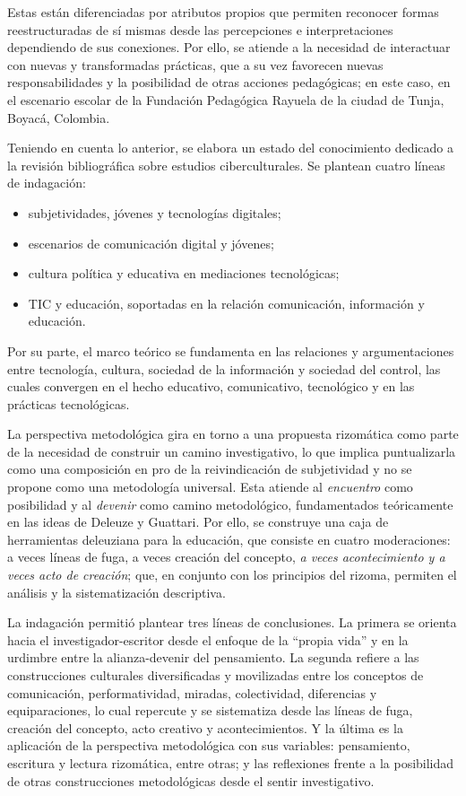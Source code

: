 \documentclass{textolivre}
\begin{document}
Estas están diferenciadas por atributos propios que permiten reconocer formas reestructuradas de sí mismas desde las percepciones e interpretaciones dependiendo de sus conexiones. Por ello, se atiende a la necesidad de interactuar con nuevas y transformadas prácticas, que a su vez favorecen nuevas responsabilidades y la posibilidad de otras acciones pedagógicas; en este caso, en el escenario escolar de la Fundación Pedagógica Rayuela de la ciudad de Tunja, Boyacá, Colombia.

Teniendo en cuenta lo anterior, se elabora un estado del conocimiento dedicado a la revisión bibliográfica sobre estudios ciberculturales. Se plantean cuatro líneas de indagación: 

\begin{itemize}
    \item subjetividades, jóvenes y tecnologías digitales;
    \item escenarios de comunicación digital y jóvenes;
    \item cultura política y educativa en mediaciones tecnológicas;
    \item TIC y educación, soportadas en la relación comunicación, información y educación. 
\end{itemize}
    
Por su parte, el marco teórico se fundamenta en las relaciones y argumentaciones entre tecnología, cultura, sociedad de la información y sociedad del control, las cuales convergen en el hecho educativo, comunicativo, tecnológico y en las prácticas tecnológicas. 

La perspectiva metodológica gira en torno a una propuesta rizomática como parte de la necesidad de construir un camino investigativo, lo que implica puntualizarla como una composición en pro de la reivindicación de subjetividad y no se propone como una metodología universal. Esta atiende al \textit{encuentro} como posibilidad y al \textit{devenir} como camino metodológico, fundamentados teóricamente en las ideas de Deleuze y Guattari. Por ello, se construye una caja de herramientas deleuziana para la educación, que consiste en cuatro moderaciones: a veces líneas de fuga, a veces creación del concepto, \textit{a veces acontecimiento y a veces acto de creación}; que, en conjunto con los principios del rizoma, permiten el análisis y la sistematización descriptiva.

La indagación permitió plantear tres líneas de conclusiones. La primera se orienta hacia el investigador-escritor desde el enfoque de la “propia vida” y en la urdimbre entre la alianza-devenir del pensamiento. La segunda refiere a las construcciones culturales diversificadas y movilizadas entre los conceptos de comunicación, performatividad, miradas, colectividad, diferencias y equiparaciones, lo cual repercute y se sistematiza desde las líneas de fuga, creación del concepto, acto creativo y acontecimientos. Y la última es la aplicación de la perspectiva metodológica con sus variables: pensamiento, escritura y lectura rizomática, entre otras; y las reflexiones frente a la posibilidad de otras construcciones metodológicas desde el sentir investigativo.
\end{document}
